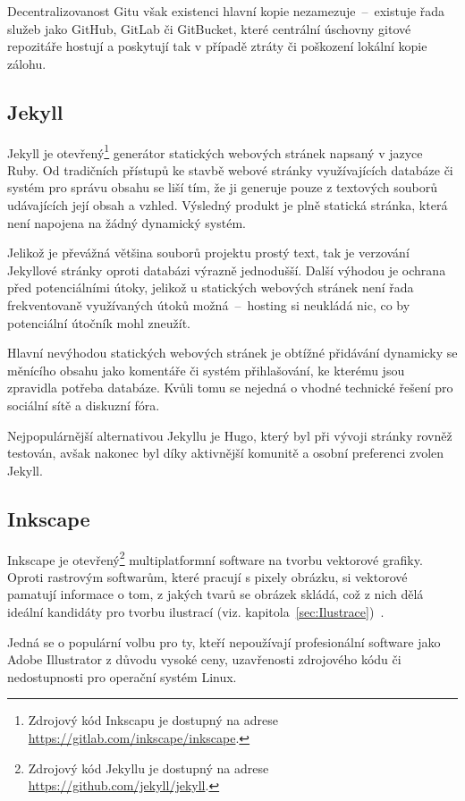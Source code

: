 \documentclass[a4paper, 12pt, twoside]{article}
\begin{document}
  Decentralizovanost Gitu však existenci hlavní kopie nezamezuje~--~existuje řada služeb jako GitHub, GitLab či GitBucket, které centrální úschovny gitové repozitáře hostují a poskytují tak v případě ztráty či poškození lokální kopie zálohu.


  \subsection{Jekyll} \label{sec:Jekyll}
  Jekyll je otevřený\footnote{Zdrojový kód Inkscapu je dostupný na adrese \url{https://gitlab.com/inkscape/inkscape}.} generátor statických webových stránek napsaný v jazyce Ruby. Od tradičních přístupů ke stavbě webové stránky využívajících databáze či systém pro správu obsahu se liší tím, že ji generuje pouze z textových souborů udávajících její obsah a vzhled. Výsledný produkt je plně statická stránka, která není napojena na žádný dynamický systém.

  Jelikož je převážná většina souborů projektu prostý text, tak je verzování Jekyllové stránky oproti databázi výrazně jednodušší. Další výhodou je ochrana před potenciálními útoky, jelikož u statických webových stránek není řada frekventovaně využívaných útoků možná~--~hosting si neukládá nic, co by potenciální útočník mohl zneužít.

  Hlavní nevýhodou statických webových stránek je obtížné přidávání dynamicky se měnícího obsahu jako komentáře či systém přihlašování, ke kterému jsou zpravidla potřeba databáze. Kvůli tomu se nejedná o vhodné technické řešení pro sociální sítě a diskuzní fóra.

  Nejpopulárnější alternativou Jekyllu je Hugo, který byl při vývoji stránky rovněž testován, avšak nakonec byl díky aktivnější komunitě a osobní preferenci zvolen Jekyll.


  \subsection{Inkscape} \label{sec:Inkscape}
  Inkscape je otevřený\footnote{Zdrojový kód Jekyllu je dostupný na adrese \url{https://github.com/jekyll/jekyll}.} multiplatformní software na tvorbu vektorové grafiky. Oproti rastrovým softwarům, které pracují s pixely obrázku, si vektorové pamatují informace o tom, z jakých tvarů se obrázek skládá, což z nich dělá ideální kandidáty pro tvorbu ilustrací (viz. kapitola~\ref{sec:Ilustrace})~\cite{vector-vs-bitmap}.

  Jedná se o populární volbu pro ty, kteří nepoužívají profesionální software jako Adobe Illustrator z důvodu vysoké ceny, uzavřenosti zdrojového kódu či nedostupnosti pro operační systém Linux.
\end{document}
